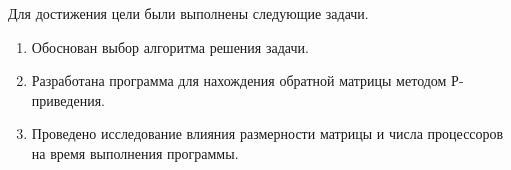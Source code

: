\Conclusion %


Для достижения цели были выполнены следующие задачи.


\begin{enumerate}
\item Обоснован выбор алгоритма решения задачи.
\item Разработана программа для нахождения обратной матрицы методом Р-приведения.
\item Проведено исследование влияния размерности матрицы и числа процессоров на время выполнения программы.
\end{enumerate}



%
%
%
%
%

